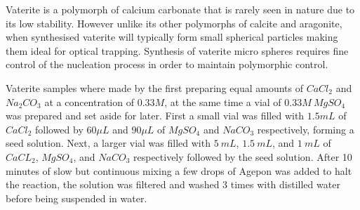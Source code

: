 Vaterite is a polymorph of calcium carbonate that is rarely seen in 
nature due to its low stability. However unlike its other polymorphs of 
calcite and aragonite, when synthesised vaterite will typically form 
small spherical particles making them ideal for optical trapping. 
Synthesis of vaterite micro spheres requires fine control of the nucleation
process in order to maintain polymorphic control.

Vaterite samples where made by the first preparing equal amounts of 
$CaCl_2$ and $Na_2CO_3$ at a concentration of $0.33M$, at the same time
a vial of $0.33M\ MgSO_4$ was prepared and set aside for later. First
a small vial was filled with $1.5mL$ of $CaCl_2$ followed by $60\mu L$ 
and $90\mu L$ of $MgSO_4$ and $NaCO_3$ respectively, forming a seed solution. 
Next, a larger vial was filled with $5\ mL$, $1.5\ mL$, and $1\ mL$ of
$CaCL_2$, $MgSO_4$, and $NaCO_3$ respectively followed by the seed solution. 
After 10 minutes of slow but continuous mixing a few drops of Agepon was added
to halt the reaction, the solution was filtered and washed 3 times with 
distilled water before being suspended in water. 

